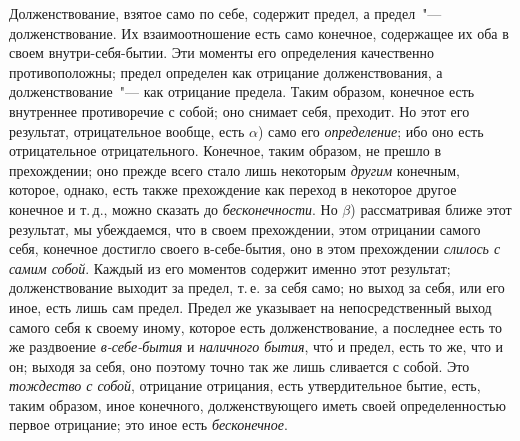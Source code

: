 Долженствование, взятое само по себе, содержит предел,
а предел~"--- долженствование. Их взаимоотношение
есть само конечное, содержащее их оба в своем внутри-себя-бытии.
Эти моменты его определения качественно
противоположны; предел определен как отрицание долженствования,
а долженствование~"--- как отрицание предела.
Таким образом, конечное есть внутреннее противоречие
с собой; оно снимает себя, преходит. Но этот его результат,
отрицательное вообще, есть $\alpha$) само его \emph{определение};
ибо оно есть отрицательное отрицательного. Конечное,
таким образом, не прешло в прехождении; оно
прежде всего стало лишь некоторым \emph{другим} конечным,
которое, однако, есть также прехождение как переход в
некоторое другое конечное и т.\,д., можно сказать до \emph{бесконечности}.
Но $\beta$) рассматривая ближе этот результат,
мы убеждаемся, что в своем прехождении, этом отрицании
самого себя, конечное достигло своего в-себе-бытия, оно
в этом прехождении \emph{слилось с самим собой}. Каждый из
его моментов содержит именно этот результат; долженствование
выходит за предел, т.\,е. за себя само; но выход
за себя, или его иное, есть лишь сам предел. Предел же
указывает на непосредственный выход самого себя к
своему иному, которое есть долженствование, а последнее
есть то же раздвоение \emph{в-себе-бытия} и \emph{наличного бытия},
чт\'о и предел, есть то же, что и он; выходя за себя,
оно поэтому точно так же лишь сливается с собой. Это
\emph{тождество с собой}, отрицание отрицания, есть утвердительное
бытие, есть, таким образом, иное конечного, долженствующего
иметь своей определенностью первое отрицание;
это иное есть \emph{бесконечное}.


